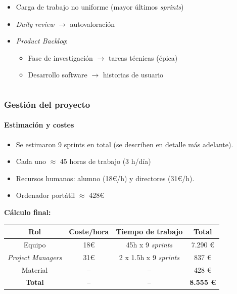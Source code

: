\documentclass{beamer}
\begin{document}
\begin{frame}
\begin{columns}[T]
\begin{column}{0.8\textwidth}
\begin{description}[labelwidth=0.01mm]
\begin{itemize}
		 			\item Carga de trabajo no uniforme (mayor últimos \textit{sprints}) 			 	\pause
		 			\item \textit{Daily review} $\rightarrow$ autovaloración
		 			\item \textit{Product Backlog}:
		 			\begin{itemize}
		 				\item Fase de investigación $\rightarrow$ tareas técnicas (épica)
		 				\item Desarrollo software $\rightarrow$ historias de usuario
		 			\end{itemize}
		 		\end{itemize}
		 	\end{description}
	 	\end{column}
	\end{columns}
\end{frame}
\begin{frame}
	\frametitle{Gestión del proyecto}
	\framesubtitle{Estimación y costes}
	\begin{itemize}
		\item Se estimaron 9 sprints en total (se describen en detalle más adelante).
		\item Cada uno $\approx$ 45 horas de trabajo (3 h/día)
		\item Recursos humanos: alumno (18€/h) y directores (31€/h).
		\item Ordenador portátil $\approx$ 428€
	\end{itemize}
	\pause
	\vspace{1cm}
\textbf{	Cálculo final:}
	\begin{table}[H]
		\centering
		{
			\setlength{\tabcolsep}{1\tabcolsep}
			\begin{tabular}{|c|c|c|c|}
				\hline
				\textbf{Rol} & \textbf{Coste/hora} & \textbf{Tiempo de trabajo} & \textbf{Total} \\ \hline
				Equipo & 18€ & 45h x 9 \textit{sprints} & 7.290 € \\ \hline
				\textit{Project Managers} & 31€ & 2 x 1.5h x 9 \textit{sprints} & 837 € \\ \hline
				Material & -- & -- & 428 € \\ \hline
				\textbf{Total} & -- & -- & \textbf{8.555 €} \\ \hline
				
			\end{tabular}%
		}
		\label{tab:metodologia/costes}
	\end{table}
	
	
\end{frame}
\end{document}
